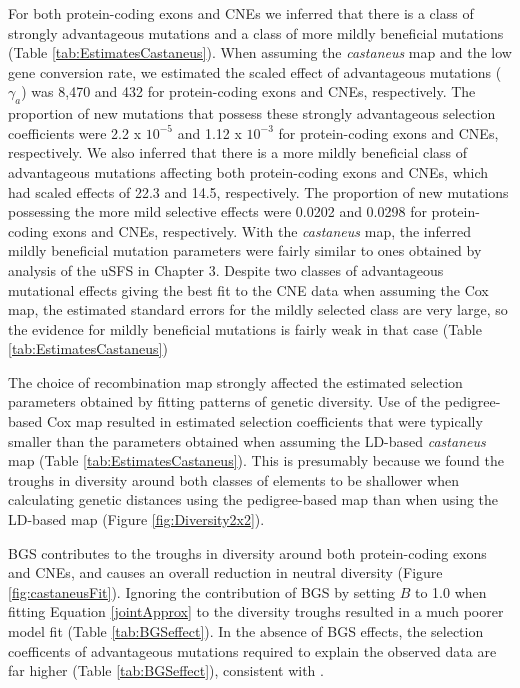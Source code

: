 {\linespread{1}

\linespread{2}

	For both protein-coding exons and CNEs we inferred that there is a class of strongly advantageous mutations and a class of more mildly beneficial mutations (Table \ref{tab:EstimatesCastaneus}). When assuming the \textit{castaneus} map and the low gene conversion rate, we estimated the scaled effect of advantageous mutations ($\gamma_a$) was 8,470 and 432 for protein-coding exons and CNEs, respectively. The proportion of new mutations that possess these strongly advantageous selection coefficients were 2.2 x $10^{-5}$ and 1.12 x $10^{-3}$ for protein-coding exons and CNEs, respectively. We also inferred that there is a more mildly beneficial class of advantageous mutations affecting both protein-coding exons and CNEs, which had scaled effects of 22.3 and 14.5, respectively. The proportion of new mutations possessing the more mild selective effects were 0.0202 and 0.0298 for protein-coding exons and CNEs, respectively. With the \textit{castaneus} map, the inferred mildly beneficial mutation parameters were fairly similar to ones obtained by analysis of the uSFS in Chapter 3. Despite two classes of advantageous mutational effects giving the best fit to the CNE data when assuming the Cox map, the estimated standard errors for the mildly selected class are very large, so the evidence for mildly beneficial mutations is fairly weak in that case (Table \ref{tab:EstimatesCastaneus})

\linespread{1}

\linespread{2}	
	
	The choice of recombination map strongly affected the estimated selection parameters obtained by fitting patterns of genetic diversity. Use of the pedigree-based Cox map resulted in estimated selection coefficients that were typically smaller than the parameters obtained when assuming the LD-based \textit{castaneus} map (Table \ref{tab:EstimatesCastaneus}). This is presumably because we found the troughs in diversity around both classes of elements to be shallower when calculating genetic distances using the pedigree-based map than when using the LD-based map (Figure \ref{fig:Diversity2x2}).
	
	BGS contributes to the troughs in diversity around both protein-coding exons and CNEs, and causes an overall reduction in neutral diversity (Figure \ref{fig:castaneusFit}). Ignoring the contribution of BGS by setting $B$ to 1.0 when fitting Equation \ref{jointApprox} to the diversity troughs resulted in a much poorer model fit (Table \ref{tab:BGSeffect}). In the absence of BGS effects, the selection coefficents of advantageous mutations required to explain the observed data are far higher (Table \ref{tab:BGSeffect}), consistent with \cite{RN290}. 
	
}
